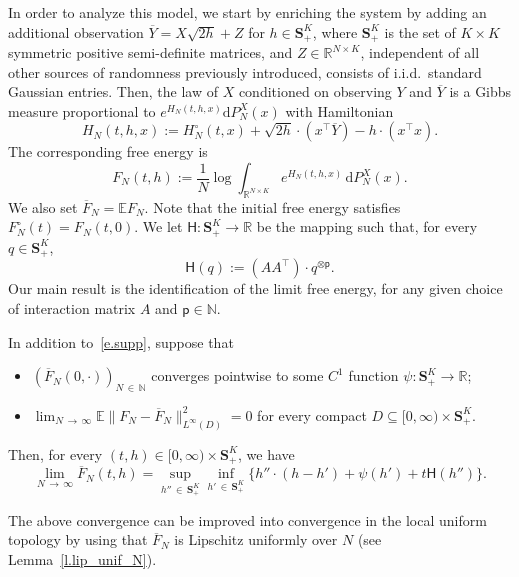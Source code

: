 \documentclass[AHL,Unicode,longabstracts,published]{cedram}
\newcommand{\N}{\mathbb{N}}
\newcommand{\R}{\mathbb{R}}
\newcommand{\E}{\mathbb{E}}
\renewcommand{\S}{\mathbf{S}}
\renewcommand{\d}{\mathrm{d}}
\renewcommand{\H}{\mathsf{H}}
\newcommand{\sfp}{\mathsf{p}}
\renewcommand{\subset}{\subseteq}
\renewcommand{\bar}{\overline}
\begin{document}
In order to analyze this model, we start by enriching the system by adding an additional observation $\bar Y=X\sqrt{2h}+Z$ for $h\in\S^K_+$, where $\S^K_+$ is the set of $K\times K$ symmetric positive semi-definite matrices, and {$Z\in \R^{N\times K}$, independent of all other sources of randomness previously introduced,} consists of i.i.d.\ standard Gaussian entries. Then, the law of $X$ conditioned on observing $Y$ and $\bar Y$ is a Gibbs measure {proportional to $e^{H_N(t,h,x)}\d P_N^X(x)$} with Hamiltonian
\begin{equation*}
H_N(t,h,x) := H^\circ_N(t,x)+ \sqrt{2h}\cdot\left(x^\intercal \bar Y\right)-h\cdot\left(x^\intercal x\right).
\end{equation*}
The corresponding free energy is
\begin{equation}\label{e.F_N}
F_N(t,h) := \frac{1}{N}\log\int_{\R^{N\times K}} e^{H_N(t,h,x)} \, \d P^X_N(x).
\end{equation}
We also set $\bar F_N = \E F_N$. Note that the initial free energy satisfies $F^\circ_N(t) = F_N(t,0)$. We let $\H:\S^K_+\to \R$ be the mapping such that, for every $q \in \S^K_+$,
\begin{equation}\label{def.H}
\H(q) := \left(AA^\intercal\right)\cdot q^{\otimes \sfp}.
\end{equation}
Our main result is the identification of the limit free energy, for any given choice of interaction matrix $A$ and $\sfp \in \N$.

\begin{theo}\label{main_thm}
In addition to~\eqref{e.supp}, suppose that
\begin{itemize}
\item $(\bar F_N(0,\cdot))_{N\,\in\,\N}$ converges pointwise to some $C^1$ function $\psi:\S^K_+\to \R$;
\item $\lim_{N\,\to\,\infty}\E\|F_N-\bar F_N\|^2_{L^\infty(D)}=0$ for every compact $D\subset [0,\infty)\times \S^K_+$.
\end{itemize}
Then, for every $(t,h)\in[0,\infty)\times \S^K_+$, we have
\begin{equation}\label{e.main_thm}
\lim_{N\,\to\,\infty}\bar F_N(t,h) = \sup_{h''\,\in\,\S^K_+}\inf_{h'\,\in\,\S^K_+}\big\{h''\cdot \left(h-h'\right)+\psi(h')+t\H(h'')\big\}.
\end{equation}
\end{theo}


\begin{rema}
The above convergence can be improved into convergence in the local uniform topology by using that $\bar F_N$ is Lipschitz uniformly over $N$ (see Lemma~\ref{l.lip_unif_N}).
\end{rema}
\end{document}
